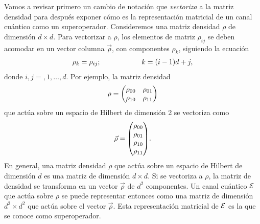 Vamos a revisar primero un cambio de notación que \textit{vectoriza} a la matriz densidad 
para después exponer cómo es la representación matricial de
un canal cuántico como un superoperador.
Consideremos una matriz densidad $\rho$ de dimensión $d\times d$.
Para vectorizar a $\rho$, los elementos de matriz $\rho_{ij}$ 
se deben acomodar en un vector columna $\vec{\rho}$, con componentes 
$\rho_k$, siguiendo la ecuación~\citep{bengtsson_zyczkowski_2017}
\begin{align}
\rho_k=\rho_{ij};\hspace{2cm} k=\qty(i-1)d+j,
\label{eq:matrix-to-vector}
\end{align}
donde $i,j=,1,\ldots,d$. Por ejemplo, la matriz densidad
\begin{align}
\rho=\mqty(\rho_{00}&\rho_{01}\\ \rho_{10}&\rho_{11})
\end{align}
que actúa sobre un espacio de Hilbert de dimensión 2 se vectoriza como 
\begin{align}
\vec{\rho}=\mqty(\rho_{00}\\ \rho_{01}\\ \rho_{10}\\ \rho_{11}).
\end{align}
En general, una matriz densidad $\rho$ que actúa 
sobre un espacio de Hilbert de dimensión $d$ es 
una matriz de dimensión $d\times d$. Si se vectoriza a $\rho$, la matriz 
de densidad se transforma en un vector $\vec{\rho}$ de $d^2$ 
componentes. Un canal cuántico $\mathcal{E}$ que actúa sobre $\rho$ se puede
representar entonces como una matriz de dimensión $d^2\times d^2$ 
que actúa sobre el vector $\vec{\rho}$. Esta representación matricial de 
$\mathcal{E}$ es la que se conoce como superoperador.

